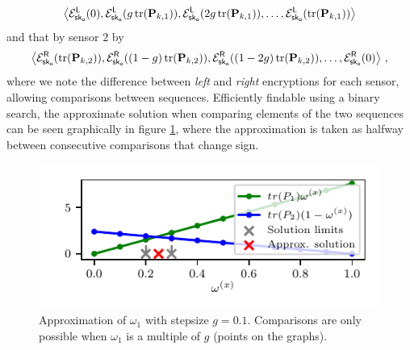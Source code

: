 \begin{equation}\label{eq:cloud_fusion:secfci_2sen_enc_seq_1}
    \left\langle\mathcal{E}^{\mathsf{L}}_{\mathsf{sk}_{\mathsf{o}}}(0), \mathcal{E}^{\mathsf{L}}_{\mathsf{sk}_{\mathsf{o}}}(g\operatorname{tr}({{\mathbf{P}}}_{k,1})), \mathcal{E}^{\mathsf{L}}_{\mathsf{sk}_{\mathsf{o}}}(2g\operatorname{tr}({{\mathbf{P}}}_{k,1})),\dots,\mathcal{E}^{\mathsf{L}}_{\mathsf{sk}_{\mathsf{o}}}(\operatorname{tr}({{\mathbf{P}}}_{k,1}))\right\rangle
\end{equation}
and that by sensor $2$ by
\begin{equation}\label{eq:cloud_fusion:secfci_2sen_enc_seq_2}
    \left\langle\mathcal{E}^{\mathsf{R}}_{\mathsf{sk}_{\mathsf{o}}}(\operatorname{tr}({{\mathbf{P}}}_{k,2})), \mathcal{E}^{\mathsf{R}}_{\mathsf{sk}_{\mathsf{o}}}((1-g)\operatorname{tr}({{\mathbf{P}}}_{k,2})), \mathcal{E}^{\mathsf{R}}_{\mathsf{sk}_{\mathsf{o}}}((1-2g)\operatorname{tr}({{\mathbf{P}}}_{k,2})),\dots,\mathcal{E}^{\mathsf{R}}_{\mathsf{sk}_{\mathsf{o}}}(0)\right\rangle\,,
\end{equation}
where we note the difference between \textit{left} and \textit{right} encryptions for each sensor, allowing comparisons between sequences. Efficiently findable using a binary search, the approximate solution when comparing elements of the two sequences can be seen graphically in figure \ref{fig:cloud_fusion:secfci_2sen_intersect}, where the approximation is taken as halfway between consecutive comparisons that change sign.
\begin{figure}[htbp]
    \begin{center}
       \includegraphics{figures/2_sensors.pdf}
    \end{center}
    \caption{Approximation of $\omega_1$ with stepsize $g=0.1$. Comparisons are only possible when $\omega_1$ is a multiple of $g$ (points on the graphs).}
    \label{fig:cloud_fusion:secfci_2sen_intersect}
 \end{figure}


